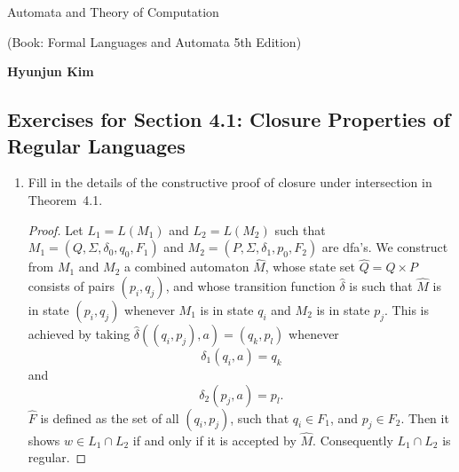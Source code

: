 \documentclass[]{book}
\theoremstyle{definition}
\begin{document}
\begin{center}
{\Large Automata and Theory of Computation} \par
(Book: Formal Languages and Automata 5th Edition) \par
\textbf{Hyunjun Kim}
\end{center}

\subsection*{Exercises for Section 4.1: Closure Properties of Regular Languages}

\begin{enumerate}
\item
    Fill in the details of the constructive proof of closure under intersection in Theorem~4.1.
\begin{proof}
    Let $L_1 = L(M_1)$ and $L_2 = L(M_2)$ such that $M_1 = (Q, \Sigma, \delta_0, q_0, F_1)$ and
    $M_2 = (P, \Sigma, \delta_1, p_0, F_2)$ are dfa's. We construct from $M_1$ and $M_2$
    a combined automaton $\hat{M}$, whose state set $\hat{Q} = Q \times P$ consists of
    pairs $(p_i, q_j)$, and whose transition function $\hat{\delta}$ is such that
    $\hat{M}$ is in state $(p_i, q_j)$ whenever $M_1$ is in state $q_i$ and $M_2$ is
    in state $p_j$. This is achieved by taking 
        $\hat{\delta}((q_i, p_j), a) = (q_k, p_l)$
    whenever
        $$\delta_1(q_i, a) = q_k$$
    and
        $$\delta_2(p_j, a) = p_l.$$
    $\hat{F}$ is defined as the set of all $(q_i, p_j)$, such that $q_i \in F_1$,
    and $p_j \in F_2$. Then it shows $w \in L_1 \cap L_2$ if and only if it is accepted by $\hat{M}$.
    Consequently $L_1 \cap L_2$ is regular.
\end{proof}


\end{enumerate}
\end{document}
